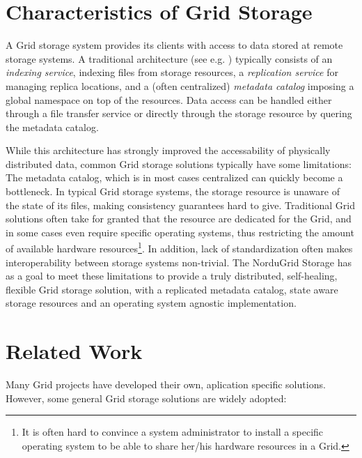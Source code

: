 \documentclass{llncs}
\begin{document}
\section{Characteristics of Grid Storage}
\label{Characteristics of Grid Storage}

A Grid storage system provides its clients with access to data
stored at remote storage systems. A traditional architecture (see
e.g. \cite{datagrid,egeeddm}) typically
consists of an {\it indexing service}, indexing files from storage
resources, a {\it replication service} for managing replica locations,
and a (often centralized) {\it metadata catalog} imposing a global
namespace on top of the resources. Data access can be handled either
through a file transfer service or directly through the storage
resource by quering the metadata catalog.

While this architecture has strongly improved the accessability of
physically distributed data, common Grid storage solutions typically have
some limitations: The metadata catalog, which is in most cases
centralized can quickly become a bottleneck. In typical Grid storage
systems, the storage resource is unaware of the state of its files,
making consistency guarantees hard to give. Traditional Grid
solutions often take for granted that the resource are dedicated for
the Grid, and in some cases even require specific operating systems,
thus restricting the amount of available hardware resources\footnote{It is often hard to convince a
system administrator to install a specific operating system to be able to share
her/his hardware resources in a Grid.}. In addition, lack of
standardization often makes interoperability between storage systems
non-trivial.
The NorduGrid Storage has as a goal to meet these limitations to
provide a truly distributed, self-healing, flexible Grid storage
solution, with a replicated metadata catalog, state aware storage
resources and an operating system agnostic implementation.

\section{Related Work}
\label{Related Work}
Many Grid projects have developed their own, aplication specific
solutions. However, some general Grid storage solutions are widely
adopted: 
\end{document}
